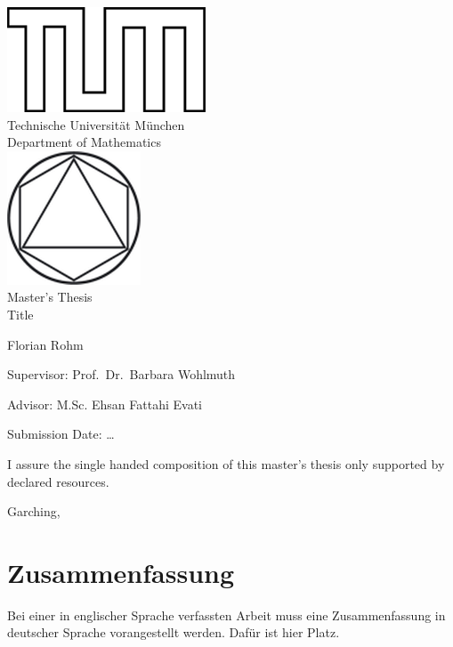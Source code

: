 \documentclass[12pt,a4paper,twoside]{article}
\begin{document}
\pagestyle{empty}
\begin{titlepage}
\begin{center}
\includegraphics{TUMlschwarz.png}\\[3mm]
\sf
{\Large
  Technische Universit\"at M\"unchen\\[5mm]
  Department of Mathematics\\[8mm]
}
\normalsize
\includegraphics{TUMlMschwarz.png}\\[15mm]

Master's Thesis\\[15mm]

{\Huge
  Title
}
\bigskip

\normalsize

Florian Rohm
\end{center}
\vspace*{75mm}

Supervisor: Prof.\ Dr.\ Barbara Wohlmuth

\medskip

Advisor: M.Sc. Ehsan Fattahi Evati
\medskip

Submission Date: \ldots

\end{titlepage}

\vspace*{150mm}

I assure the single handed composition of this master's thesis only supported by declared resources.
\bigskip

Garching,
\newpage
\section*{Zusammenfassung}
Bei einer in englischer Sprache verfassten Arbeit muss eine Zusammenfassung in deutscher Sprache vorangestellt werden.
Daf\"ur ist hier Platz.
\end{document}
